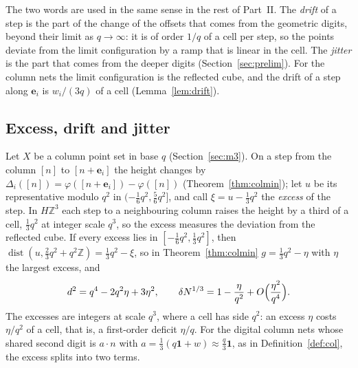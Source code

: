 \documentclass[11pt]{amsart}
\theoremstyle{definition}
\theoremstyle{plain}
\newcommand{\Z}{\mathbb{Z}}
\newcommand{\e}{\mathbf{e}}
\begin{document}
The two words are used in the same sense in the rest of Part~II. The \emph{drift} of a step is the part of the change of the offsets that comes from the geometric digits, beyond their limit as $q\to\infty$: it is of order $1/q$ of a cell per step, so the points deviate from the limit configuration by a ramp that is linear in the cell. The \emph{jitter} is the part that comes from the deeper digits (Section~\ref{sec:prelim}). For the column nets the limit configuration is the reflected cube, and the drift of a step along $\e_i$ is $w_i/(3q)$ of a cell (Lemma~\ref{lem:drift}).

\subsection{Excess, drift and jitter}\label{sec:excess}
Let $X$ be a column point set in base $q$ (Section~\ref{sec:m3}). On a step from the column $[n]$ to $[n+\e_i]$ the height changes by $\Delta_i([n])=\varphi([n+\e_i])-\varphi([n])$ (Theorem~\ref{thm:colmin}); let $u$ be its representative modulo $q^2$ in $(-\frac16q^2,\frac56q^2]$, and call $\xi=u-\frac13q^2$ the \emph{excess} of the step. In $H\Z^3$ each step to a neighbouring column raises the height by a third of a cell, $\frac13q^2$ at integer scale $q^3$, so the excess measures the deviation from the reflected cube. If every excess lies in $[-\frac16q^2,\frac13q^2]$, then $\operatorname{dist}(u,\frac23q^2+q^2\Z)=\frac13q^2-\xi$, so in Theorem~\ref{thm:colmin} $g=\frac13q^2-\eta$ with $\eta$ the largest excess, and
\[
d^2=q^4-2q^2\eta+3\eta^2,\qquad \delta N^{1/3}=1-\frac\eta{q^2}+O\Bigl(\frac{\eta^2}{q^4}\Bigr).
\]
The excesses are integers at scale $q^3$, where a cell has side $q^2$: an excess $\eta$ costs $\eta/q^2$ of a cell, that is, a first-order deficit $\eta/q$. For the digital column nets whose shared second digit is $a\cdot n$ with $a=\frac13(q\mathbf 1+w)\approx\frac q3\mathbf 1$, as in Definition~\ref{def:col}, the excess splits into two terms.
\end{document}
